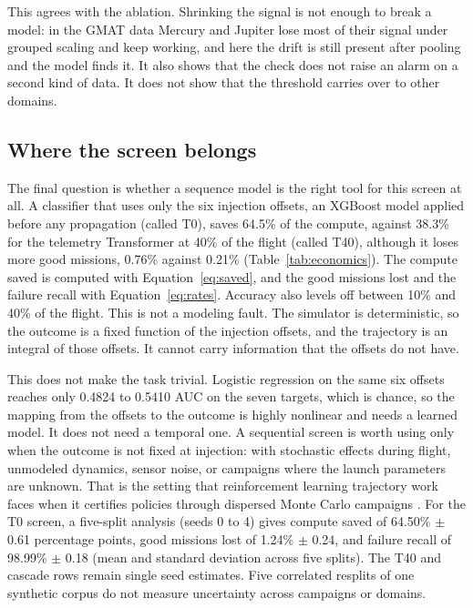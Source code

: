 This agrees with the ablation. Shrinking the signal is not enough to break a model: in the GMAT data Mercury and Jupiter lose most of their signal under grouped scaling and keep working, and here the drift is still present after pooling and the model finds it. It also shows that the check does not raise an alarm on a second kind of data. It does not show that the threshold carries over to other domains.

\subsection{Where the screen belongs}
\label{sec:screen}

The final question is whether a sequence model is the right tool for this screen at all. A classifier that uses only the six injection offsets, an XGBoost model applied before any propagation (called T0), saves 64.5\% of the compute, against 38.3\% for the telemetry Transformer at 40\% of the flight (called T40), although it loses more good missions, 0.76\% against 0.21\% (Table~\ref{tab:economics}). The compute saved is computed with Equation~\ref{eq:saved}, and the good missions lost and the failure recall with Equation~\ref{eq:rates}. Accuracy also levels off between 10\% and 40\% of the flight. This is not a modeling fault. The simulator is deterministic, so the outcome is a fixed function of the injection offsets, and the trajectory is an integral of those offsets. It cannot carry information that the offsets do not have.


This does not make the task trivial. Logistic regression on the same six offsets reaches only 0.4824 to 0.5410 AUC on the seven targets, which is chance, so the mapping from the offsets to the outcome is highly nonlinear and needs a learned model. It does not need a temporal one. A sequential screen is worth using only when the outcome is not fixed at injection: with stochastic effects during flight, unmodeled dynamics, sensor noise, or campaigns where the launch parameters are unknown. That is the setting that reinforcement learning trajectory work faces when it certifies policies through dispersed Monte Carlo campaigns \cite{zavoli2021}. For the T0 screen, a five-split analysis (seeds 0 to 4) gives compute saved of 64.50\% $\pm$ 0.61 percentage points, good missions lost of 1.24\% $\pm$ 0.24, and failure recall of 98.99\% $\pm$ 0.18 (mean and standard deviation across five splits). The T40 and cascade rows remain single seed estimates. Five correlated resplits of one synthetic corpus do not measure uncertainty across campaigns or domains.

